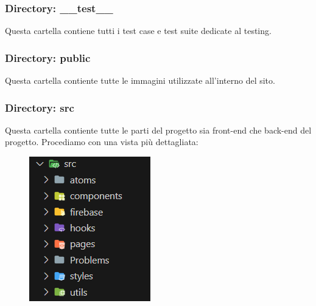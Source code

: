 \documentclass[11pt, a4paper]{article}
\theoremstyle{definition}
\begin{document}
\subsubsection{Directory: \_\_test\_\_}
Questa cartella contiene tutti i test case e test suite dedicate al testing.
\subsubsection{Directory: public}
Questa cartella contiente tutte le immagini utilizzate all'interno del sito.
\subsubsection{Directory: src}
Questa cartella contiente tutte le parti del progetto sia front-end che back-end del progetto. Procediamo con una vista più dettagliata:

\begin{figure}[H]
  \centering
  \includegraphics[scale = 1.2]{materiale/src.png}
\end{figure}
\end{document}
